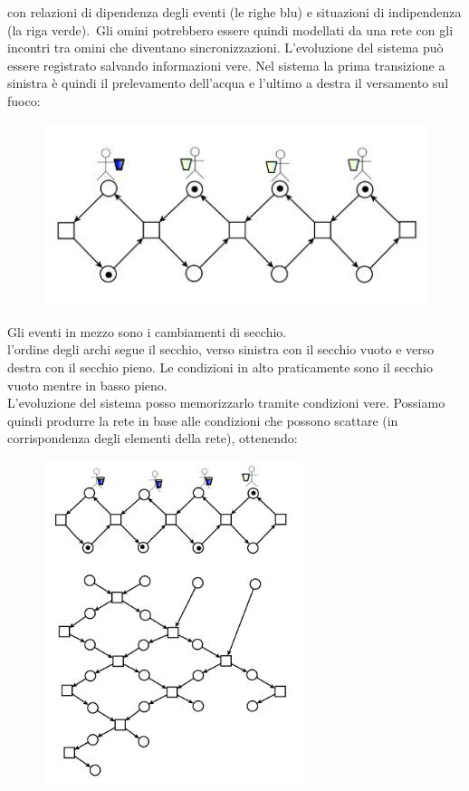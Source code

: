 \documentclass[a4paper,12pt, oneside]{book}
\begin{document}
con relazioni di dipendenza degli eventi (le righe blu) e situazioni di
indipendenza (la riga verde).\ 
Gli omini potrebbero essere quindi
modellati da una rete con gli incontri tra omini che diventano
sincronizzazioni. L'evoluzione del sistema può essere registrato salvando
informazioni vere. Nel sistema la prima transizione a sinistra è quindi il
prelevamento dell'acqua e l'ultimo a destra il versamento sul fuoco:
\begin{figure}[H]
  \centering
  \includegraphics[scale = 0.5]{img/inc.jpg} 
\end{figure}
Gli eventi in mezzo sono i cambiamenti di secchio.\\
l'ordine degli archi segue il secchio, verso sinistra con il secchio vuoto e
verso destra con il secchio pieno. Le condizioni in alto praticamente sono il
secchio vuoto mentre in basso pieno.\\
L'evoluzione del sistema posso memorizzarlo tramite condizioni vere. 
Possiamo quindi produrre la rete in base alle condizioni che possono scattare
(in corrispondenza degli elementi della rete),
ottenendo:
\begin{figure}[H]
  \centering
  \includegraphics[scale = 0.7]{img/inc2.jpg} 
\end{figure}
\end{document}
